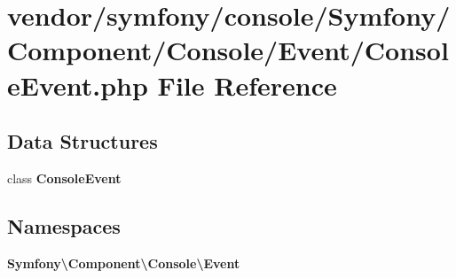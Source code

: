 \section{vendor/symfony/console/\+Symfony/\+Component/\+Console/\+Event/\+Console\+Event.php File Reference}
\label{_console_event_8php}
\subsection*{Data Structures}
\begin{DoxyCompactItemize}
\item 
class {\bf Console\+Event}
\end{DoxyCompactItemize}
\subsection*{Namespaces}
\begin{DoxyCompactItemize}
\item 
 {\bf Symfony\textbackslash{}\+Component\textbackslash{}\+Console\textbackslash{}\+Event}
\end{DoxyCompactItemize}
